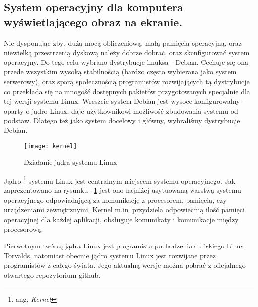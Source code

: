 \subsection{System operacyjny dla komputera wyświetlającego obraz na ekranie.}

Nie dysponując zbyt dużą mocą obliczeniową, małą pamięcią operacyjną, oraz niewielką przestrzenią dyskową należy dobrze dobrać, oraz skonfigurować system operacyjny. Do tego celu wybrano dystrybucje linuksa - Debian. Cechuje się ona przede wszystkim wysoką stabilnością (bardzo często wybierana jako system serwerowy), oraz sporą społecznością programistów rozwijających tą dystrybucje co przekłada się na mnogość dostępnych pakietów przygotowanych specjalnie dla tej wersji systemu Linux. Wreszcie system Debian jest wysoce konfigurowalny - oparty o jądro Linux, daje użytkownikowi możliwość zbudowania systemu od podstaw. Dlatego też jako system docelowy i główny, wybraliśmy dystrybucje Debian.

\begin{figure}
\begin{center}
    \texttt{[image: kernel]}
\end{center}
\caption{Działanie jądra systemu Linux}
\label{fig:kernel}
\end{figure}

Jądro \footnote{ang. \emph{Kernel}} systemu Linux jest centralnym miejscem systemu operacyjnego. Jak zaprezentowano na rysunku ~\ref{fig:kernel} jest ono najniżej usytuowaną warstwą systemu operacyjnego odpowiadającą za komunikację z procesorem, pamięcią, czy urządzeniami zewnętrznymi. Kernel m.in. przydziela odpowiednią ilość pamięci operacyjnej dla każdej aplikacji, obsługuje komunikaty i komunikacje między procesorową.

Pierwotnym twórcą jądra Linux jest programista pochodzenia duńskiego Linus Torvalds, natomiast obecnie jądro systemu Linux jest rozwijane przez programistów z całego świata. Jego aktualną wersje można pobrać z oficjalnego otwartego repozytorium github.






